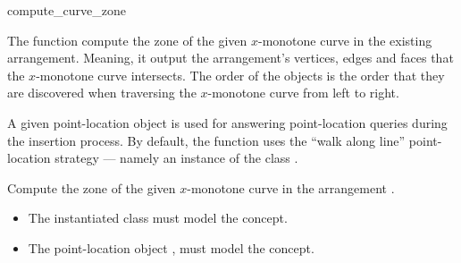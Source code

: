 \ccRefPageBegin

\begin{ccRefFunction}{compute_curve_zone}

\ccDefinition

The function \ccRefName{} compute the zone of the given $x$-monotone
curve in the existing arrangement. Meaning, it output the
arrangement's vertices, edges and faces that the $x$-monotone curve 
intersects. The order of the objects is the order that they are
discovered when traversing the $x$-monotone curve from left to right.

A given point-location object is used for answering point-location queries
during the insertion process. By default, the function uses the
``walk along line'' point-location strategy --- namely an instance of the
class .



Compute the zone of the given $x$-monotone curve  in the
arrangement .


\ccRequirements
\begin{itemize}
\item The instantiated  class must model the
   concept. 
\item The point-location object , must model the
   concept.
\end{itemize}

\end{ccRefFunction}

\ccRefPageEnd
